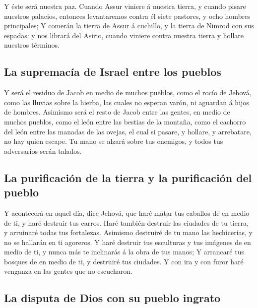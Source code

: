  Y éste será nuestra paz. Cuando Assur viniere á nuestra
tierra, y cuando pisare nuestros palacios, entonces levantaremos contra
él siete pastores, y ocho hombres principales;  Y comerán
la tierra de Assur á cuchillo, y la tierra de Nimrod con sus espadas: y
nos librará del Asirio, cuando viniere contra nuestra tierra y hollare
nuestros términos.

\hypertarget{la-supremacuxeda-de-israel-entre-los-pueblos}{%
\subsection{La supremacía de Israel entre los
pueblos}\label{la-supremacuxeda-de-israel-entre-los-pueblos}}

 Y será el residuo de Jacob en medio de muchos pueblos,
como el rocío de Jehová, como las lluvias sobre la hierba, las cuales no
esperan varón, ni aguardan á hijos de hombres.  Asimismo
será el resto de Jacob entre las gentes, en medio de muchos pueblos,
como el león entre las bestias de la montaña, como el cachorro del león
entre las manadas de las ovejas, el cual si pasare, y hollare, y
arrebatare, no hay quien escape.  Tu mano se alzará sobre
tus enemigos, y todos tus adversarios serán talados.

\hypertarget{la-purificaciuxf3n-de-la-tierra-y-la-purificaciuxf3n-del-pueblo}{%
\subsection{La purificación de la tierra y la purificación del
pueblo}\label{la-purificaciuxf3n-de-la-tierra-y-la-purificaciuxf3n-del-pueblo}}

 Y acontecerá en aquel día, dice Jehová, que haré matar
tus caballos de en medio de ti, y haré destruir tus carros.
 Haré también destruir las ciudades de tu tierra, y
arruinaré todas tus fortalezas.  Asimismo destruiré de tu
mano las hechicerías, y no se hallarán en ti agoreros.  Y
haré destruir tus esculturas y tus imágenes de en medio de ti, y nunca
más te inclinarás á la obra de tus manos;  Y arrancaré
tus bosques de en medio de ti, y destruiré tus ciudades. 
Y con ira y con furor haré venganza en las gentes que no escucharon.

\hypertarget{la-disputa-de-dios-con-su-pueblo-ingrato}{%
\subsection{La disputa de Dios con su pueblo
ingrato}\label{la-disputa-de-dios-con-su-pueblo-ingrato}}

